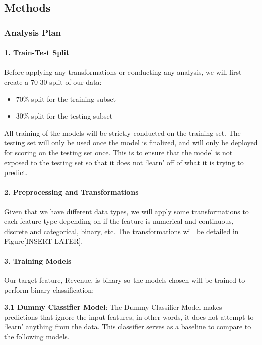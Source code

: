 \documentclass[
  letterpaper,
  DIV=11,
  numbers=noendperiod]{scrartcl}
\let\oldparagraph\paragraph
\renewcommand{\paragraph}[1]{\oldparagraph{#1}\mbox{}}
\begin{document}
\subsection{Methods}\label{methods}

\subsubsection{Analysis Plan}\label{analysis-plan}

\paragraph{1. Train-Test Split}\label{train-test-split}

Before applying any transformations or conducting any analysis, we will
first create a 70-30 split of our data:

\begin{itemize}
\item
  70\% split for the training subset
\item
  30\% split for the testing subset
\end{itemize}

All training of the models will be strictly conducted on the training
set. The testing set will only be used once the model is finalized, and
will only be deployed for scoring on the testing set once. This is to
ensure that the model is not exposed to the testing set so that it does
not `learn' off of what it is trying to predict.

\paragraph{2. Preprocessing and
Transformations}\label{preprocessing-and-transformations}

Given that we have different data types, we will apply some
transformations to each feature type depending on if the feature is
numerical and continuous, discrete and categorical, binary, etc. The
transformations will be detailed in Figure{[}INSERT LATER{]}.

\paragraph{3. Training Models}\label{training-models}

Our target feature, Revenue, is binary so the models chosen will be
trained to perform binary classification:

\textbf{3.1 Dummy Classifier Model}: The Dummy Classifier Model makes
predictions that ignore the input features, in other words, it does not
attempt to `learn' anything from the data. This classifier serves as a
baseline to compare to the following models.
\end{document}

